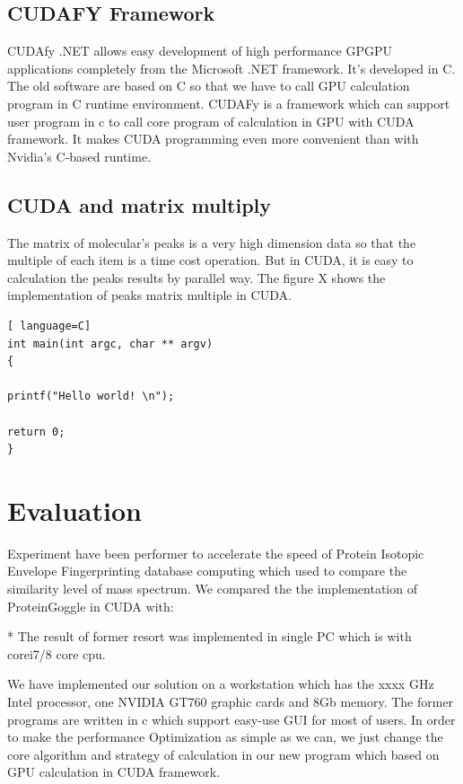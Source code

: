 \documentclass[letterpaper,twocolumn,10pt]{article}
\begin{document}
\subsection{CUDAFY Framework}
CUDAfy .NET allows easy development of high performance GPGPU applications completely from the Microsoft .NET framework. It's developed in C. The old software are based on C so that we have to call GPU calculation program in C runtime environment. CUDAFy is a framework which can support user program in c to call core program of calculation in GPU with CUDA framework. It makes CUDA programming even more convenient than with Nvidia's C-based runtime. 

\subsection{CUDA and matrix multiply}

The matrix of molecular's peaks is a very high dimension data so that the multiple of each item is a time cost operation. But in CUDA, it is easy to calculation the peaks results by parallel way.  The figure X shows the implementation of peaks matrix multiple in CUDA.

\begin{lstlisting}[ language=C] 
int main(int argc, char ** argv) 
{ 

printf("Hello world! \n"); 

return 0; 
} 
\end{lstlisting} 

\section{Evaluation}

Experiment have been performer to accelerate the speed of Protein Isotopic Envelope Fingerprinting  database computing which used to compare the similarity level of mass spectrum. We compared the the implementation of ProteinGoggle in CUDA with:

* The result of former resort was implemented in single PC which is with corei7/8 core cpu.

We have implemented our solution on a workstation which has the xxxx GHz Intel processor, one NVIDIA GT760 graphic cards and 8Gb memory. The former programs are written in c which support easy-use GUI for most of users. In order to make the performance Optimization as simple as we can, we just change the core algorithm and strategy of calculation in our new program which based on GPU calculation in CUDA framework.
\end{document}
